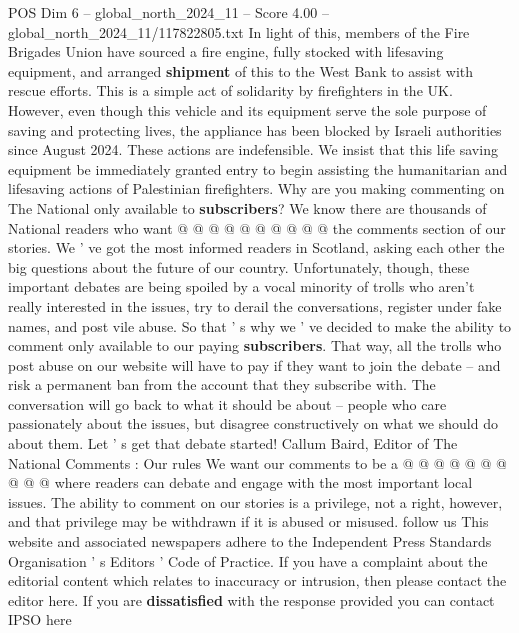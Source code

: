\begin{textsample}{POS Dim 6 – global\_north\_2024\_11 – Score 4.00 – global\_north\_2024\_11/117822805.txt}
In light of this, members of the Fire Brigades Union have sourced a fire engine, fully stocked with lifesaving equipment, and arranged \textbf{shipment} of this to the West Bank to assist with rescue efforts.
This is a simple act of solidarity by firefighters in the UK.
However, even though this vehicle and its equipment serve the sole purpose of saving and protecting lives, the appliance has been blocked by Israeli authorities since August 2024.
These actions are indefensible.
We insist that this life saving equipment be immediately granted entry to begin assisting the humanitarian and lifesaving actions of Palestinian firefighters.
Why are you making commenting on The National only available to \textbf{subscribers}?
We know there are thousands of National readers who want @ @ @ @ @ @ @ @ @ @ the comments section of our stories.
We ' ve got the most informed readers in Scotland, asking each other the big questions about the future of our country.
Unfortunately, though, these important debates are being spoiled by a vocal minority of trolls who aren't really interested in the issues, try to derail the conversations, register under fake names, and post vile abuse.
So that ' s why we ' ve decided to make the ability to comment only available to our paying \textbf{subscribers}.
That way, all the trolls who post abuse on our website will have to pay if they want to join the debate -- and risk a permanent ban from the account that they subscribe with.
The conversation will go back to what it should be about -- people who care passionately about the issues, but disagree constructively on what we should do about them.
Let ' s get that debate started!
Callum Baird, Editor of The National Comments : Our rules We want our comments to be a @ @ @ @ @ @ @ @ @ @ where readers can debate and engage with the most important local issues.
The ability to comment on our stories is a privilege, not a right, however, and that privilege may be withdrawn if it is abused or misused. follow us This website and associated newspapers adhere to the Independent Press Standards Organisation ' s Editors ' Code of Practice.
If you have a complaint about the editorial content which relates to inaccuracy or intrusion, then please contact the editor here.
If you are \textbf{dissatisfied} with the response provided you can contact IPSO here

\end{textsample}
